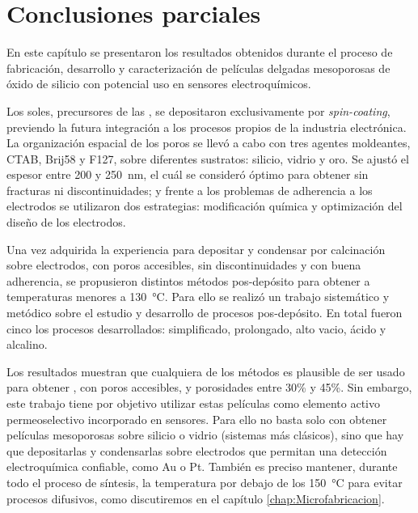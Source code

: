 \section{Conclusiones parciales}
	
	En este capítulo se presentaron los resultados obtenidos durante el proceso de fabricación, desarrollo y caracterización de películas delgadas mesoporosas de óxido de silicio con potencial uso en sensores electroquímicos.
	
	Los soles, precursores de las \pdm, se depositaron exclusivamente por \textit{spin-coating}, previendo la futura integración a los procesos propios de la industria electrónica. La organización espacial de los poros se llevó a cabo con tres agentes moldeantes, CTAB, Brij58 y F127, sobre diferentes sustratos: silicio, vidrio y oro. Se ajustó el espesor entre 200 y \SI{250}{\nm}, el cuál se consideró óptimo para obtener \pdm\space sin fracturas ni discontinuidades; y frente a los problemas de adherencia a los electrodos se utilizaron dos estrategias: modificación química y optimización del diseño de los electrodos. 

	Una vez adquirida la experiencia para depositar y condensar por calcinación \pdm\space sobre electrodos, con poros accesibles, sin discontinuidades y con buena adherencia, se propusieron distintos métodos pos-depósito para obtener \pdm\space a temperaturas menores a \SI{130}{\celsius}. Para ello se realizó un trabajo sistemático y metódico sobre el estudio y desarrollo de procesos pos-depósito. En total fueron cinco los procesos desarrollados: simplificado, prolongado, alto vacio, ácido y alcalino.

	Los resultados muestran que cualquiera de los métodos es plausible de ser usado para obtener \pdm, con poros accesibles, y porosidades entre 30\% y 45\%. Sin embargo, este trabajo tiene por objetivo utilizar estas películas como elemento activo permeoselectivo incorporado en sensores. Para ello no basta solo con obtener películas mesoporosas sobre silicio o vidrio (sistemas más clásicos), sino que hay que depositarlas y condensarlas sobre electrodos que permitan una detección electroquímica confiable, como Au o Pt. También es preciso mantener, durante todo el proceso de síntesis, la temperatura por debajo de los \SI{150}{\celsius} para evitar procesos difusivos, como discutiremos en el capítulo \ref{chap:Microfabricacion}.


